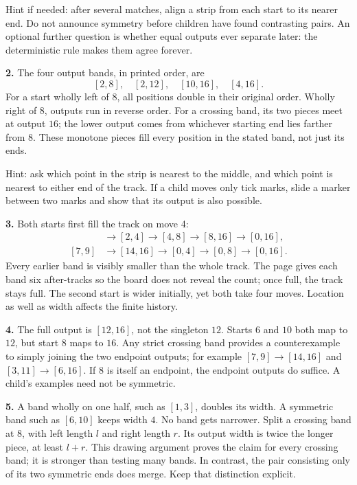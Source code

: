 \documentclass[11pt,letterpaper]{article}
\begin{document}
Hint if needed: after several matches, align a strip from each start to its nearer end. Do not announce symmetry before children have found contrasting pairs. An optional further question is whether equal outputs ever separate later: the deterministic rule makes them agree forever.

\textbf{2.} The four output bands, in printed order, are
\[[2,8],\quad[2,12],\quad[10,16],\quad[4,16].\]
For a start wholly left of $8$, all positions double in their original order. Wholly right of $8$, outputs run in reverse order. For a crossing band, its two pieces meet at output $16$; the lower output comes from whichever starting end lies farther from $8$. These monotone pieces fill every position in the stated band, not just its ends.

Hint: ask which point in the strip is nearest to the middle, and which point is nearest to either end of the track. If a child moves only tick marks, slide a marker between two marks and show that its output is also possible.

\textbf{3.} Both starts first fill the track on move 4:
\begin{align*}
[1,2]&\to[2,4]\to[4,8]\to[8,16]\to[0,16],\\
[7,9]&\to[14,16]\to[0,4]\to[0,8]\to[0,16].
\end{align*}
Every earlier band is visibly smaller than the whole track. The page gives each band six after-tracks so the board does not reveal the count; once full, the track stays full. The second start is wider initially, yet both take four moves. Location as well as width affects the finite history.

\textbf{4.} The full output is $[12,16]$, not the singleton $12$. Starts $6$ and $10$ both map to $12$, but start $8$ maps to $16$. Any strict crossing band provides a counterexample to simply joining the two endpoint outputs; for example $[7,9]\to[14,16]$ and $[3,11]\to[6,16]$. If $8$ is itself an endpoint, the endpoint outputs do suffice. A child's examples need not be symmetric.

\textbf{5.} A band wholly on one half, such as $[1,3]$, doubles its width. A symmetric band such as $[6,10]$ keeps width $4$. No band gets narrower. Split a crossing band at $8$, with left length $l$ and right length $r$. Its output width is twice the longer piece, at least $l+r$. This drawing argument proves the claim for every crossing band; it is stronger than testing many bands. In contrast, the pair consisting only of its two symmetric ends does merge. Keep that distinction explicit.
\newpage
\end{document}
